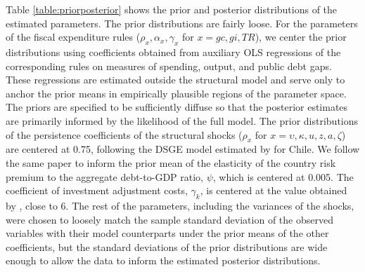 \documentclass[12pt]{article}
\begin{document}
Table \ref{table:priorposterior} shows the prior and posterior distributions of the estimated parameters. The prior distributions are fairly loose. For the parameters of the fiscal expenditure rules ($\rho_x, \alpha_x, \gamma_x$ for $x = gc, gi, TR$), we center the prior distributions using coefficients obtained from auxiliary OLS regressions of the corresponding rules on measures of spending, output, and public debt gaps. These regressions are estimated outside the structural model and serve only to anchor the prior means in empirically plausible regions of the parameter space. The priors are specified to be sufficiently diffuse so that the posterior estimates are primarily informed by the likelihood of the full model. The prior distributions of the persistence coefficients of the structural shocks ($\rho_x$ for $x=\upsilon, \kappa, u, z, a, \zeta$) are centered at 0.75, following the DSGE model estimated by \citet{guerra2021search} for Chile. We follow the same paper to inform the prior mean of the elasticity of the country risk premium to the aggregate debt-to-GDP ratio, $\psi$, which is centered at 0.005. The coefficient of investment adjustment costs, $\gamma_k$, is centered at the value obtained by \citet{smets2007shocks}, close to 6. The rest of the parameters, including the variances of the shocks, were chosen to loosely match the sample standard deviation of the observed variables with their model counterparts under the prior means of the other coefficients, but the standard deviations of the prior distributions are wide enough to allow the data to inform the estimated posterior distributions.
\end{document}
